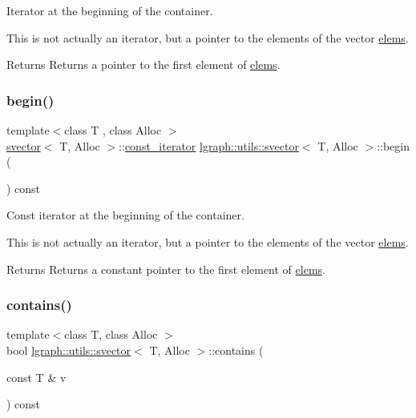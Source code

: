 Iterator at the beginning of the container. 

This is not actually an iterator, but a pointer to the elements of the vector \hyperlink{classlgraph_1_1utils_1_1svector_aa72e9ffeb58f88d3cb01671e3e672a45}{elems}. \begin{DoxyReturn}{Returns}
Returns a pointer to the first element of \hyperlink{classlgraph_1_1utils_1_1svector_aa72e9ffeb58f88d3cb01671e3e672a45}{elems}. 
\end{DoxyReturn}
\mbox{\label{classlgraph_1_1utils_1_1svector_a7130177e6dfb14ee07f5bdadcc97706c}} 
\subsubsection{\texorpdfstring{begin()}{begin()}\hspace{0.1cm}{\footnotesize\ttfamily [2/2]}}
{\footnotesize\ttfamily template$<$class T , class Alloc $>$ \\
\hyperlink{classlgraph_1_1utils_1_1svector}{svector}$<$ T, Alloc $>$\+::\hyperlink{classlgraph_1_1utils_1_1svector_a50774ce617a742e76f3fb8cc0a7a9445}{const\+\_\+iterator} \hyperlink{classlgraph_1_1utils_1_1svector}{lgraph\+::utils\+::svector}$<$ T, Alloc $>$\+::begin (\begin{DoxyParamCaption}{ }\end{DoxyParamCaption}) const}



Const iterator at the beginning of the container. 

This is not actually an iterator, but a pointer to the elements of the vector \hyperlink{classlgraph_1_1utils_1_1svector_aa72e9ffeb58f88d3cb01671e3e672a45}{elems}. \begin{DoxyReturn}{Returns}
Returns a constant pointer to the first element of \hyperlink{classlgraph_1_1utils_1_1svector_aa72e9ffeb58f88d3cb01671e3e672a45}{elems}. 
\end{DoxyReturn}
\mbox{\label{classlgraph_1_1utils_1_1svector_a363a3c9cee98869619b855342bc5c803}} 
\subsubsection{\texorpdfstring{contains()}{contains()}}
{\footnotesize\ttfamily template$<$class T, class Alloc $>$ \\
bool \hyperlink{classlgraph_1_1utils_1_1svector}{lgraph\+::utils\+::svector}$<$ T, Alloc $>$\+::contains (\begin{DoxyParamCaption}\item[{const T \&}]{v }\end{DoxyParamCaption}) const}



